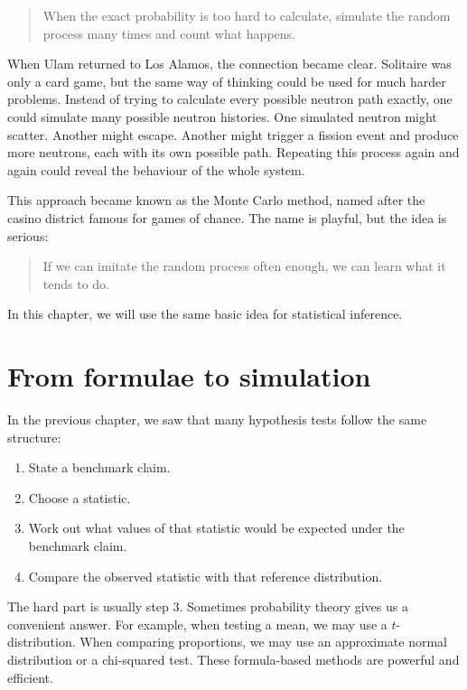 \documentclass[
  letterpaper,
  DIV=11,
  numbers=noendperiod]{scrreprt}
\providecommand{\tightlist}{%
  \setlength{\itemsep}{0pt}\setlength{\parskip}{0pt}}
\begin{document}
\begin{quote}
When the exact probability is too hard to calculate, simulate the random
process many times and count what happens.
\end{quote}

When Ulam returned to Los Alamos, the connection became clear. Solitaire
was only a card game, but the same way of thinking could be used for
much harder problems. Instead of trying to calculate every possible
neutron path exactly, one could simulate many possible neutron
histories. One simulated neutron might scatter. Another might escape.
Another might trigger a fission event and produce more neutrons, each
with its own possible path. Repeating this process again and again could
reveal the behaviour of the whole system.

This approach became known as the Monte Carlo method, named after the
casino district famous for games of chance. The name is playful, but the
idea is serious:

\begin{quote}
If we can imitate the random process often enough, we can learn what it
tends to do.
\end{quote}

In this chapter, we will use the same basic idea for statistical
inference.

\section{From formulae to simulation}\label{from-formulae-to-simulation}

In the previous chapter, we saw that many hypothesis tests follow the
same structure:

\begin{enumerate}
\def\labelenumi{\arabic{enumi}.}
\tightlist
\item
  State a benchmark claim.
\item
  Choose a statistic.
\item
  Work out what values of that statistic would be expected under the
  benchmark claim.
\item
  Compare the observed statistic with that reference distribution.
\end{enumerate}

The hard part is usually step 3. Sometimes probability theory gives us a
convenient answer. For example, when testing a mean, we may use a
\(t\)-distribution. When comparing proportions, we may use an
approximate normal distribution or a chi-squared test. These
formula-based methods are powerful and efficient.
\end{document}
